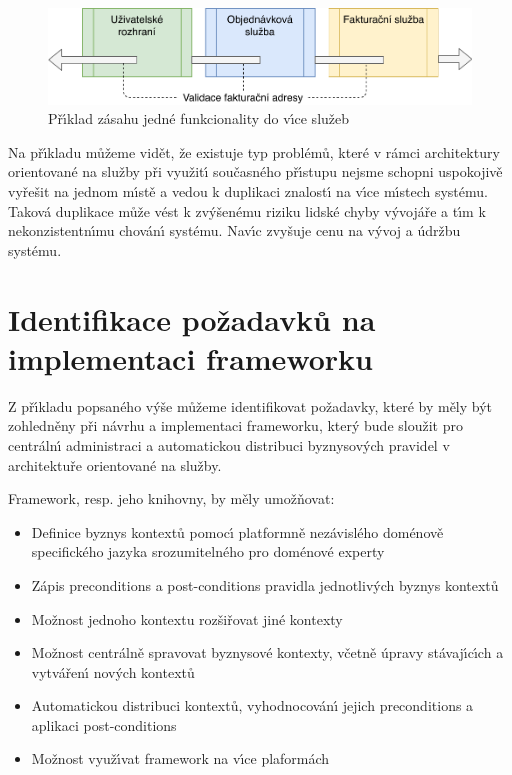 \begin{figure}
    \centering
    \includegraphics[keepaspectratio=true, width=0.8\linewidth]{figures/service-cutting.pdf}
    \caption{Př\'{\i}klad zásahu jedné funkcionality do v\'{\i}ce služeb}
    \label{fig:service-cutting}
\end{figure}

Na př\'{\i}kladu můžeme vidět, že existuje typ problémů, které v rámci architektury
orientované na služby při využit\'{\i} současného př\'{\i}stupu nejsme schopni uspokojivě
vyřešit na jednom m\'{\i}stě a vedou k duplikaci znalost\'{\i} na v\'{\i}ce m\'{\i}stech systému.
Taková duplikace může vést k zv\'yšenému riziku lidské chyby v\'yvojáře a t\'{\i}m k
nekonzistentn\'{\i}mu chován\'{\i} systému. Nav\'{\i}c zvyšuje cenu na v\'yvoj a údržbu systému.

\section{Identifikace požadavků na implementaci frameworku}\label{sec:implementation-requirements}

Z př\'{\i}kladu popsaného v\'yše můžeme identifikovat požadavky, které by měly
b\'yt zohledněny při návrhu a implementaci frameworku, kter\'y bude sloužit
pro centráln\'{\i} administraci a automatickou distribuci byznysov\'ych pravidel
v architektuře orientované na služby.

Framework, resp. jeho knihovny, by měly umožňovat:

\begin{itemize}
    \item{Definice byznys kontextů pomoc\'{\i} platformně nezávislého doménově specifického jazyka srozumitelného pro doménové experty}
    \item{Zápis preconditions a post-conditions pravidla jednotliv\'ych byznys kontextů}
    \item{Možnost jednoho kontextu rozšiřovat jiné kontexty}
    \item{Možnost centrálně spravovat byznysové kontexty, včetně úpravy stávaj\'{\i}c\'{\i}ch a vytvářen\'{\i} nov\'ych kontextů}
    \item{Automatickou distribuci kontextů, vyhodnocován\'{\i} jejich preconditions a aplikaci post-conditions}
    \item{Možnost využ\'{\i}vat framework na v\'{\i}ce plaformách}
\end{itemize}

